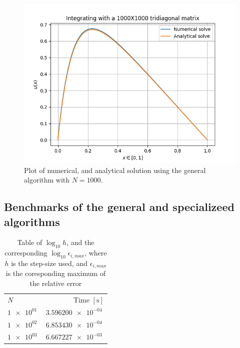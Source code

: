 \documentclass[english,notitlepage]{revtex4-1}  %
\begin{document}
\begin{figure}[H]
	\centering
	\label{fig413}
	\includegraphics[width=\columnwidth]{../figures/NumVsAnal1000x1000.png}
	\caption{Plot of numerical, and analytical solution using the general algorithm with
	\(N=1000\).}
\end{figure}

\subsection{Benchmarks of the general and specializeed algorithms}\label{subsec:42}
\begin{table}[H]
	\centering
	\label{tab:421}
	\begin{tabular}{l|r}
	\(N\) & Time \([\si{\second}]\) \\
	\(\SI{1e+01}{}\) & \(\SI{3.596200e-04}{}\) \\
	\(\SI{1e+02}{}\) & \(\SI{6.853430e-04}{}\) \\
	\(\SI{1e+03}{}\) & \(\SI{6.667227e-03}{}\) \\
	\end{tabular}
	\caption{Table of \(\log_{10}h\), and the corresponding \(\log_{10}\epsilon_{i,max}\),
	where \(h\) is the step-size used, and \(\epsilon_{i,max}\) is the coresponding
	maximum of the relative error}
\end{table}
\end{document}
